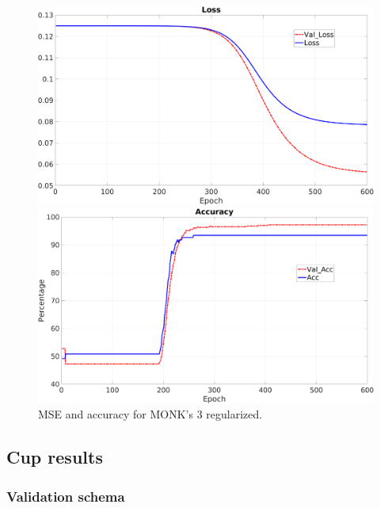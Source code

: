 \begin{figure}[H]
    \centering
    \begin{minipage}[t]{0.5\linewidth}
        \includegraphics[width=\linewidth]{img/Monk3_loss_Reg.png}
    \end{minipage}%
    \begin{minipage}[t]{0.5\linewidth}
        \includegraphics[width=\linewidth]{img/Monk3_accuracy_Reg.png}
    \end{minipage}
    \caption{MSE and accuracy for MONK’s 3 regularized.}
\end{figure}



\subsection{Cup results}

\subsubsection{Validation schema}

